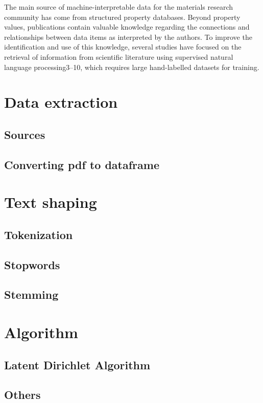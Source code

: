 
The main source of machine-interpretable data for the materials research community has come from structured property databases. Beyond property values, publications contain valuable knowledge regarding the connections and relationships between data items as interpreted by the authors. To improve the identification and use of this knowledge, several studies have focused on the retrieval of information from scientific literature using supervised natural language processing3–10, which requires large hand-labelled datasets for training.
 
\section{Data extraction}

\subsection{Sources}
\subsection{Converting pdf to dataframe}

\section{Text shaping}


\subsection{Tokenization}
\subsection{Stopwords}
\subsection{Stemming}

\section{Algorithm}
\subsection{Latent Dirichlet Algorithm}
\subsection{Others}

